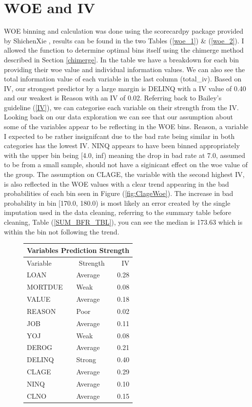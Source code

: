 \section{WOE and IV}

WOE binning and calculation was done using the scorecardpy package provided by ShichenXie \parencite{scorecardpy},  results can be found in the two Tables (\ref{woe_1}) \& (\ref{woe_2}). I allowed the function to determine optimal bins itself using the chimerge method described in Section \ref{chimerge}. In the table we have a breakdown for each bin providing their woe value and individual information values. We can also see the total information value of each variable in the last column (total\_iv). Based on IV,  our strongest predictor by a large margin is DELINQ with a IV value of 0.40 and our weakest is Reason with an IV of 0.02. Referring back to Bailey's guideline (\ref{IV})\parencite{bailey2004credit}, we can categorise each variable on their strength from the IV.\\

Looking back on our data exploration we can see that our assumption about some of the variables appear to be reflecting in the WOE bins. Reason, a variable I expected to be rather insignifcant due to the bad rate being similar in both categories has the lowest IV. NINQ appears to have been binned appropriately with the upper bin being [4.0, inf) meaning the drop in bad rate at 7.0, assumed to be from a small sample, should not have a siginicant effect on the woe value of the group. The assumption on CLAGE, the variable with the second highest IV, is also reflected in the WOE values with a clear trend appearing in the bad probabilities of each bin seen in Figure (\ref{fig:ClageWoe}). The increase in bad probability in bin [170.0, 180.0) is most likely an error created by the single imputation used in the data cleaning, referring to the summary table before cleaning, Table (\ref{SUM_BFR_TBL}), you can see the median is 173.63 which is within the bin not following the trend.

\begin{figure}[ht]\label{Table2}
	\centering
	\renewcommand{\arraystretch}{1.25}
	\begin{tabular}{llr}
	\multicolumn{3}{c}{Variables Prediction Strength}\\
	\hline
	Variable & \multicolumn{1}{c}{Strength} & IV\\ 
	\hline
	LOAN & Average & 0.28\\
	MORTDUE & Weak & 0.08\\
	VALUE & Average & 0.18\\
	REASON & Poor & 0.02\\
	JOB & Average & 0.11\\
	YOJ & Weak & 0.08\\
	DEROG & Average & 0.21\\
	DELINQ & Strong & 0.40\\
	CLAGE & Average & 0.29\\
	NINQ & Average & 0.10\\
	CLNO & Average & 0.15\\
	\bottomrule
	\end{tabular}
\end{figure}

